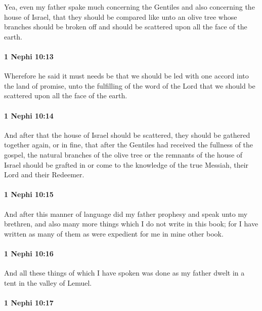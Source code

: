 			Yea, even my father spake much concerning the Gentiles
			and also concerning the house of Israel,
			that they should be compared like unto an olive tree
			whose branches should be broken off
			and should be scattered upon all the face of the earth.

		\paragraph{1 Nephi 10:13} %
			\label{1NEPHI-10-13}

			Wherefore he said it must needs be
			that we should be led with one accord into the land of promise,
			unto the fulfilling of the word of the Lord
			that we should be scattered upon all the face of the earth.

		\paragraph{1 Nephi 10:14} %
			\label{1NEPHI-10-14}

			And after that the house of Israel should be scattered,
			they should be gathered together again,
			or in fine, that after the Gentiles had received the fullness of the gospel,
			the natural branches of the olive tree or the remnants of the house of Israel
			should be grafted in or come to the knowledge of the true Messiah,
			their Lord and their Redeemer.

		\paragraph{1 Nephi 10:15} %
			\label{1NEPHI-10-15}

			And after this manner of language did my father prophesy
			and speak unto my brethren,
			and also many more things which I do not write in this book;
			for I have written as many of them as were expedient for me in mine other book.

		\paragraph{1 Nephi 10:16} %
			\label{1NEPHI-10-16}

			And all these things of which I have spoken was done
			as my father dwelt in a tent in the valley of Lemuel.

		\paragraph{1 Nephi 10:17} %
			\label{1NEPHI-10-17}

